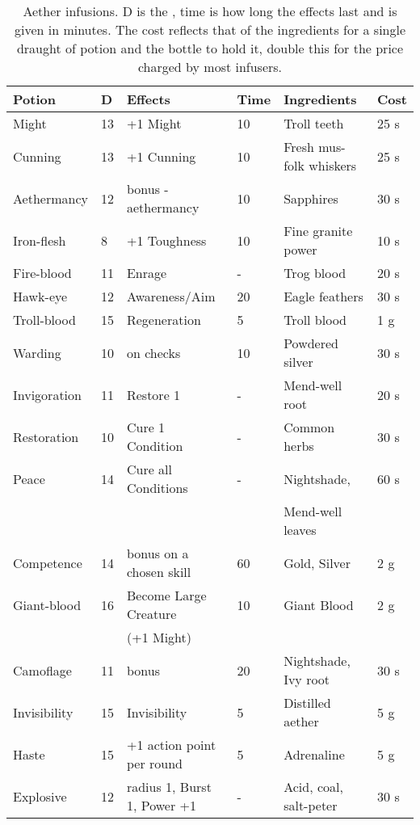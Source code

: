 \documentclass[a4paper,11pt,oneside]{book}
\newcommand{\textlf}[1]{\textbf{\titlecap{#1}}}
\begin{document}
\begin{table}[ht!]
\caption{Aether infusions. D is the \textlf{difficulty}, time is how long the effects last and is given in minutes. The cost reflects that of the ingredients for a single draught of potion and the bottle to hold it, double this for the price charged by most infusers.}
\begin{tabular}{|l|l|l|l|l|l|}
\hline
Potion & D & Effects & Time & Ingredients & Cost \\
\hline
Might &  13 & +1 Might & 10 & Troll teeth & 25 s \\
Cunning & 13 & +1 Cunning & 10 & Fresh mus-folk whiskers & 25 s \\
Aethermancy & 12 &\textlf{edge} bonus - aethermancy & 10 & Sapphires & 30 s\\
Iron-flesh & 8 & +1 Toughness & 10 & Fine granite power & 10 s \\
Fire-blood & 11 & Enrage & - & Trog blood & 20 s \\
Hawk-eye & 12 & \textlf{edge} Awareness/Aim & 20 & Eagle feathers & 30 s \\
Troll-blood & 15 & Regeneration & 5 & Troll blood & 1 g \\
Warding & 10 & \textlf{edge} on \textlf{resist} checks & 10 & Powdered silver & 30 s \\ 
Invigoration & 11 & Restore 1 \textlf{endurance} & - & Mend-well root & 20 s \\
Restoration & 10 & Cure 1 Condition & - & Common herbs & 30 s \\
Peace & 14 & Cure all Conditions & - & Nightshade,  & 60 s \\
 & & & & Mend-well leaves & \\
Competence & 14 & \textlf{edge} bonus on a chosen skill & 60 & Gold, Silver & 2 g \\
Giant-blood & 16 & Become Large Creature  & 10 & Giant Blood & 2 g \\
 & & (+1 Might) & & & \\
Camoflage & 11 & \textlf{Stealth edge} bonus & 20 & Nightshade, Ivy root & 30 s \\
Invisibility & 15 & Invisibility & 5 & Distilled aether & 5 g \\
Haste & 15 & +1 action point per round & 5 & Adrenaline & 5 g \\ 
Explosive & 12 & radius 1, Burst 1, Power +1 & - & Acid, coal, salt-peter & 30 s \\
\hline
\end{tabular}
\label{tab:alch}
\end{table}
\end{document}

